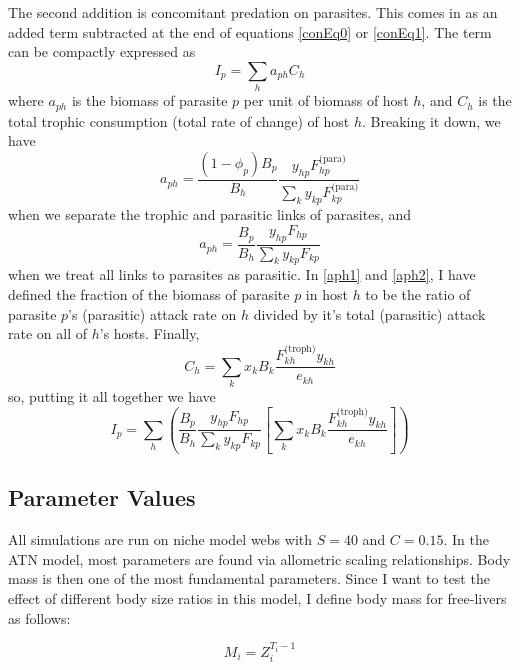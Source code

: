 \documentclass[11pt]{amsart}
\begin{document}
The second addition is concomitant predation on parasites.  This comes in as an added term subtracted at the end of equations \eqref{conEq0} or \eqref{conEq1}.  The term can be compactly expressed as 
\begin{equation}
I_p = \sum_ha_{ph}C_h \label{Ip1}
\end{equation}
where $a_{ph}$ is the biomass of parasite $p$ per unit of biomass of host $h$, and $C_h$ is the total trophic consumption (total rate of change) of host $h$.  Breaking it down, we have
\begin{equation}
a_{ph} = \frac{(1-\phi_p)B_p}{B_h}\frac{y_{hp}F^\text{(para)}_{hp}}{\sum_{k}y_{kp}F^\text{(para)}_{kp}} \label{aph1}
\end{equation}
when we separate the trophic and parasitic links of parasites, and
\begin{equation}
a_{ph} = \frac{B_p}{B_h}\frac{y_{hp}F_{hp}}{\sum_{k}y_{kp}F_{kp}} \label{aph2}
\end{equation}
when we treat all links to parasites as parasitic.  In \eqref{aph1} and \eqref{aph2}, I have defined the fraction of the biomass of parasite $p$ in host $h$ to be the ratio of parasite $p$'s (parasitic) attack rate on $h$ divided by it's total (parasitic) attack rate on all of $h$'s hosts.  Finally,
\begin{equation}
C_h = \sum_kx_kB_k\frac{F^\text{(troph)}_{kh}y_{kh}}{e_{kh}} \label{CphEq}
\end{equation}
so, putting it all together we have
\begin{equation}
I_p = \sum_h \left(\frac{B_p}{B_h}\frac{y_{hp}F_{hp}}{\sum_{k}y_{kp}F_{kp}}\left[\sum_kx_kB_k\frac{F^\text{(troph)}_{kh}y_{kh}}{e_{kh}}\right] \right) \label{Ip2}
\end{equation}

\subsection{Parameter Values}
All simulations are run on niche model webs with $S = 40$ and $C = 0.15$.  In the ATN model, most parameters are found via allometric scaling relationships.  Body mass is then one of the most fundamental parameters.  Since I want to test the effect of different body size ratios in this model, I define body mass for free-livers as follows:

\begin{equation}
M_i = Z_i^{T_i-1} \label{MF}
\end{equation}
\end{document}
